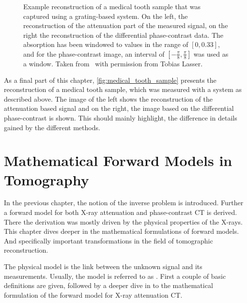 \begin{figure}
	\centering
	\caption{Example reconstruction of a medical tooth sample that was captured using a
                grating-based system. On the left, the reconstruction of the attenuation part of the
                measured signal, on the right the reconstruction of the differential phase-contrast
                data. The absorption has been windowed to values in the range of \([0, 0.33]\), and
                for the phase-contrast image, an interval of \([-\frac{\pi}{8}, \frac{\pi}{8}]\) was
                used as a window. Taken from~\cite{wieczorek_anisotropic_2017} with permission from
                Tobias Lasser.}
	\label{fig:medical_tooth_sample}
\end{figure}

As a final part of this chapter, \autoref{fig:medical_tooth_sample} presents the reconstruction of a
medical tooth sample, which was measured with a system as described above. The image of the left
shows the reconstruction of the attenuation based signal and on the right, the image based on the
differential phase-contrast is shown. This should mainly highlight, the difference in details gained
by the different methods.

\chapter{Mathematical Forward Models in Tomography}\label{chap:radon_transform_and_related}

In the previous chapter, the notion of the inverse problem is introduced. Further a forward model
for both X-ray attenuation and phase-contrast CT is derived. There the derivation was mostly driven
by the physical properties of the X-rays. This chapter dives deeper in the mathematical formulations
of forward models. And specifically important transformations in the field of tomographic
reconstruction.

The physical model is the link between the unknown signal and its measurements. Usually, the model
is referred to as . First a couple of basic definitions are given, followed by a
deeper dive in to the mathematical formulation of the forward model for X-ray attenuation CT\@.

